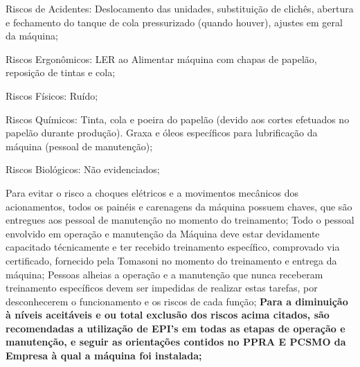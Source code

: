 \begin{typeOfRisks}
\item Riscos de Acidentes: Deslocamento das unidades, substituição de clichês, abertura e fechamento do tanque de cola pressurizado (quando houver), ajustes em geral da máquina;
\item Riscos Ergonômicos: LER ao Alimentar máquina com chapas de papelão, reposição de tintas e cola;
\item Riscos Físicos: Ruído;
\item Riscos Químicos: Tinta, cola e poeira do papelão (devido aos cortes efetuados no papelão durante produção). Graxa e
óleos específicos para lubrificação da máquina (pessoal de manutenção);
\item Riscos Biológicos: Não evidenciados;
\end{typeOfRisks}
Para evitar o risco a choques elétricos e a movimentos mecânicos dos acionamentos, todos os painéis e carenagens da
máquina possuem chaves, que são entregues aos pessoal de manutenção no momento do treinamento;
Todo o pessoal envolvido em operação e manutenção da Máquina deve estar devidamente capacitado técnicamente e ter
recebido treinamento específico, comprovado via certificado, fornecido pela Tomasoni no momento do treinamento e
entrega da máquina;
Pessoas alheias a operação e a manutenção que nunca receberam treinamento específicos devem ser impedidas de
realizar estas tarefas, por desconhecerem o funcionamento e os riscos de cada função;
\textbf{Para a diminuição à níveis aceitáveis e ou total exclusão dos riscos acima citados, são recomendadas a utilização de EPI's
em todas as etapas de operação e manutenção, e seguir as orientações contidos no PPRA E PCSMO da Empresa à qual a
máquina foi instalada;}

